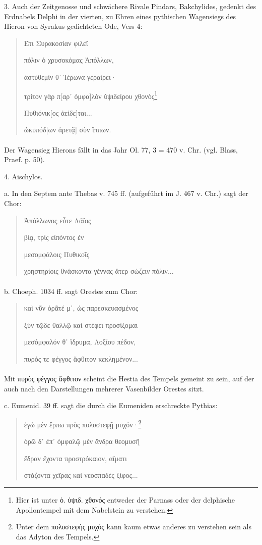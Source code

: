\documentclass[a4paper, 11pt, oneside]{article}
\begin{document}
3. Auch der Zeitgenosse und schwächere Rivale Pindars, Bakchylides, gedenkt des Erdnabels Delphi in der vierten, zu Ehren eines pythischen Wagensiegs des Hieron von Syrakus gedichteten Ode, Vers 4:
\begin{quotation}
Έτι Συρακοσίαν φιλεῖ

πόλιν ὁ χρυσοκόμας Ἀπόλλων,

ἀστύθεμίν θ᾽ Ἱέρωνα γεραίρει·

τρίτον γὰρ π[αρ᾽ ὀμφα]λὸν ὑψιδείρου χθονὸς\footnote{Hier ist unter ὀ. ὑψιδ. χθονός entweder der Parnass oder der delphische Apollontempel mit dem Nabelstein zu verstehen.}

Πυθιόνικ[ος ἀείδε]ται...

ὠκυπόδ[ων ἀρετᾷ] σὺν ἵππων.
\end{quotation}
\paragraph{}
Der Wagensieg Hierons fällt in das Jahr Ol. 77, 3 = 470 v. Chr. (vgl. Blass, Praef. p. 50).

4. Aischylos.

a. In den Septem ante Thebas v. 745 ff. (aufgeführt im J. 467 v. Chr.) sagt der Chor:
\begin{quotation}
Ἀπόλλωνος εὖτε Λάϊος

βίᾳ, τρὶς εἰπόντος ἐν

μεσομφάλοις Πυθικοῖς

χρηστηρίοις θνάσκοντα γέννας ἄτερ σώζειν πόλιν...
\end{quotation}
\paragraph{}
b. Choeph. 1034 ff. sagt Orestes zum Chor:
\begin{quotation}
καὶ νῦν ὁρᾶτέ μ᾽, ὡς παρεσκευασμένος

ξὺν τῷδε θαλλῷ καὶ στέφει προσίξομαι

μεσόμφαλόν θ᾽ ἴδρυμα, Λοξίου πέδον,

πυρός τε φέγγος ἄφθιτον κεκλημένον...
\end{quotation}
\paragraph{}
Mit πυρὸς φέγγος ἄφθιτον scheint die Hestia des Tempels gemeint zu sein, auf der auch nach den Darstellungen mehrerer Vasenbilder Orestes sitzt.

c. Eumenid. 39 ff. sagt die durch die Eumeniden erschreckte Pythias:
\begin{quotation}
ἐγὼ μὲν ἕρπω πρὸς πολυστεφῇ μυχόν·\footnote{Unter dem πολυστεφὴς μυχός kann kaum etwas anderes zu verstehen sein als das Adyton des Tempels.}

ὁρῶ δ᾽ ἐπ᾽ ὀμφαλῷ μὲν ἄνδρα θεομυσῆ

ἕδραν ἔχοντα προστρόκαιον, αἵματι

στάζοντα χεῖρας καὶ νεοσπαδὲς ξίφος...
\end{quotation}
\end{document}
